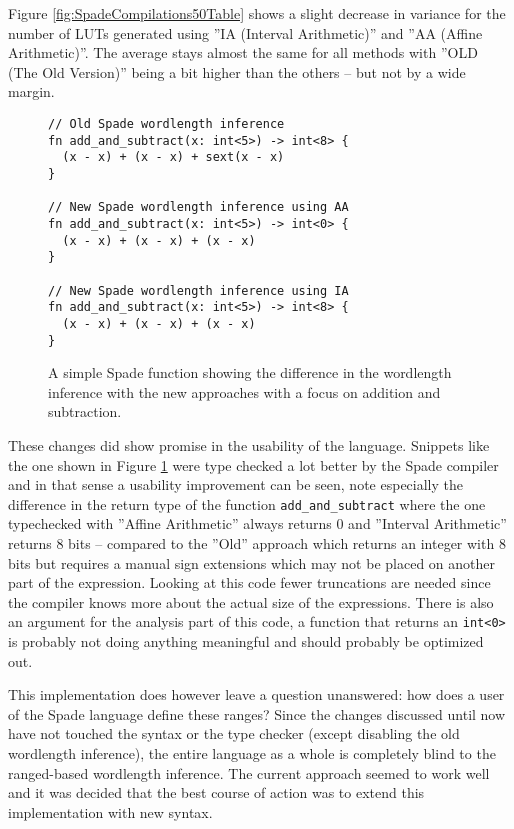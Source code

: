 Figure \ref{fig:SpadeCompilations50Table} shows a slight decrease in variance for the number of LUTs generated using ''IA (Interval Arithmetic)'' and ''AA (Affine Arithmetic)''. The average stays almost the same for all methods with ''OLD (The Old Version)'' being a bit higher than the others -- but not by a wide margin.

\begin{figure}[h!]
\begin{verbatim}
// Old Spade wordlength inference
fn add_and_subtract(x: int<5>) -> int<8> {
  (x - x) + (x - x) + sext(x - x)
}

// New Spade wordlength inference using AA
fn add_and_subtract(x: int<5>) -> int<0> {
  (x - x) + (x - x) + (x - x)
}

// New Spade wordlength inference using IA
fn add_and_subtract(x: int<5>) -> int<8> {
  (x - x) + (x - x) + (x - x)
}
\end{verbatim}
  \caption{A simple Spade function showing the difference in the wordlength inference with the new approaches with a focus on addition and subtraction.}
  \label{fig:CodeThatWorksNow}
\end{figure}

These changes did show promise in the usability of the language. Snippets like the one shown in Figure \ref{fig:CodeThatWorksNow} were type checked a lot better by the Spade compiler and in that sense a usability improvement can be seen, note especially the difference in the return type of the function \verb+add_and_subtract+ where the one typechecked with ''Affine Arithmetic'' always returns 0 and ''Interval Arithmetic'' returns 8 bits -- compared to the ''Old'' approach which returns an integer with 8 bits but requires a manual sign extensions which may not be placed on another part of the expression. Looking at this code fewer truncations are needed since the compiler knows more about the actual size of the expressions. There is also an argument for the analysis part of this code, a function that returns an \verb+int<0>+ is probably not doing anything meaningful and should probably be optimized out.

This implementation does however leave a question unanswered: how does a user of the Spade language define these ranges? Since the changes discussed until now have not touched the syntax or the type checker (except disabling the old wordlength inference), the entire language as a whole is completely blind to the ranged-based wordlength inference. The current approach seemed to work well and it was decided that the best course of action was to extend this implementation with new syntax.

